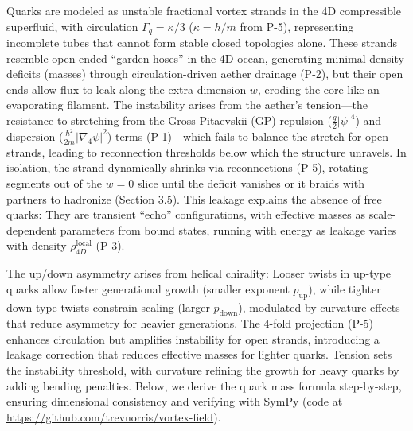 Quarks are modeled as unstable fractional vortex strands in the 4D compressible superfluid, with circulation $\Gamma_q = \kappa / 3$ ($\kappa = h / m$ from P-5), representing incomplete tubes that cannot form stable closed topologies alone. These strands resemble open-ended ``garden hoses'' in the 4D ocean, generating minimal density deficits (masses) through circulation-driven aether drainage (P-2), but their open ends allow flux to leak along the extra dimension $w$, eroding the core like an evaporating filament. The instability arises from the aether's tension---the resistance to stretching from the Gross-Pitaevskii (GP) repulsion ($\frac{g}{2} |\psi|^4$) and dispersion ($\frac{\hbar^2}{2m} |\nabla_4 \psi|^2$) terms (P-1)---which fails to balance the stretch for open strands, leading to reconnection thresholds below which the structure unravels. In isolation, the strand dynamically shrinks via reconnections (P-5), rotating segments out of the $w=0$ slice until the deficit vanishes or it braids with partners to hadronize (Section 3.5). This leakage explains the absence of free quarks: They are transient ``echo'' configurations, with effective masses as scale-dependent parameters from bound states, running with energy as leakage varies with density $\rho_{4D}^{\text{local}}$ (P-3).

The up/down asymmetry arises from helical chirality: Looser twists in up-type quarks allow faster generational growth (smaller exponent $p_{\text{up}}$), while tighter down-type twists constrain scaling (larger $p_{\text{down}}$), modulated by curvature effects that reduce asymmetry for heavier generations. The 4-fold projection (P-5) enhances circulation but amplifies instability for open strands, introducing a leakage correction that reduces effective masses for lighter quarks. Tension sets the instability threshold, with curvature refining the growth for heavy quarks by adding bending penalties. Below, we derive the quark mass formula step-by-step, ensuring dimensional consistency and verifying with SymPy (code at \url{https://github.com/trevnorris/vortex-field}).

